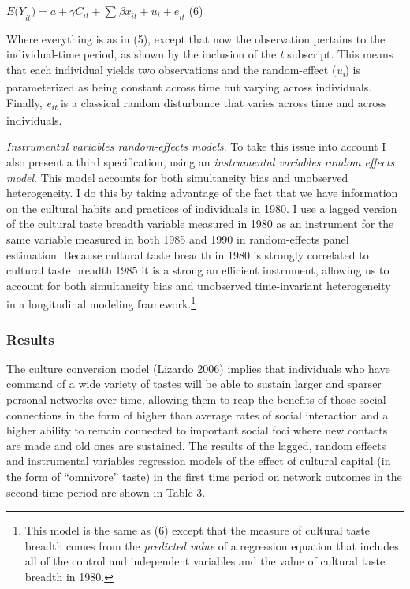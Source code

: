 \({E(Y}_{it}^{}) = a + \gamma C_{it}^{} + \sum_{}^{}{\beta x_{it}^{} + {u_{i} + e}_{it}}\) (6)

Where everything is as in (5), except that now the observation pertains to the individual-time period, as shown by the inclusion of the \emph{t} subscript. This means that each individual yields two observations and the random-effect (\emph{u\textsubscript{i}}) is parameterized as being constant across time but varying across individuals. Finally, \emph{e\textsubscript{it}} is a classical random disturbance that varies across time and across individuals.

\emph{Instrumental variables random-effects models}. To take this issue into account I also present a third specification, using an \emph{instrumental variables random effects model}. This model accounts for both simultaneity bias and unobserved heterogeneity. I do this by taking advantage of the fact that we have information on the cultural habits and practices of individuals in 1980. I use a lagged version of the cultural taste breadth variable measured in 1980 as an instrument for the same variable measured in both 1985 and 1990 in random-effects panel estimation. Because cultural taste breadth in 1980 is strongly correlated to cultural taste breadth 1985 it is a strong an efficient instrument, allowing us to account for both simultaneity bias and unobserved time-invariant heterogeneity in a longitudinal modeling framework.\footnote{This model is the same as (6) except that the measure of cultural taste breadth comes from the \emph{predicted value} of a regression equation that includes all of the control and independent variables and the value of cultural taste breadth in 1980.}

\subsubsection{Results}\label{results-1}

The culture conversion model (Lizardo 2006) implies that individuals who have command of a wide variety of tastes will be able to sustain larger and sparser personal networks over time, allowing them to reap the benefits of those social connections in the form of higher than average rates of social interaction and a higher ability to remain connected to important social foci where new contacts are made and old ones are sustained. The results of the lagged, random effects and instrumental variables regression models of the effect of cultural capital (in the form of ``omnivore'' taste) in the first time period on network outcomes in the second time period are shown in Table 3.

